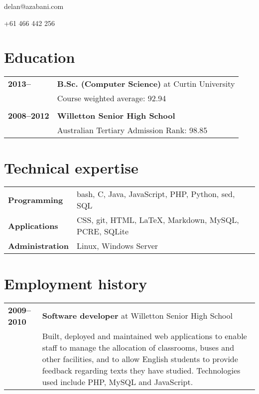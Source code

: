 \documentclass[a4paper,12pt]{article}
\begin{document}
\hrulefill

\hspace{1cm}\begin{minipage}{7cm}
	{\Huge delan\textcolor{lg}@azabani\textcolor{lg}{.com}}
\end{minipage}\hfill\begin{minipage}{4cm}
	\hfill	+61 466 442 256	\par
\end{minipage}\hspace{1cm}

\hrulefill

\section*{Education}

\begin{tabular}{p{4cm}p{14cm}}
	\textbf{2013--} &
		\textbf{B.Sc. (Computer Science)} at Curtin University\\
		& Course weighted average: 92.94\\\\
	\textbf{2008--2012} &
		\textbf{Willetton Senior High School}\\
		& Australian Tertiary Admission Rank: 98.85\\
\end{tabular}

\section*{Technical expertise}

\begin{tabular}{p{4cm}p{14cm}}
	\textbf{Programming} &
		bash, C, Java, JavaScript, PHP, Python, sed, SQL \\
	\textbf{Applications} &
		CSS, git, HTML, \LaTeX, Markdown, MySQL, PCRE, SQLite \\
	\textbf{Administration} &
		Linux, Windows Server \\
\end{tabular}

\section*{Employment history}

\begin{tabular}{p{4cm}p{14cm}}
	\textbf{2009--2010} &
		\textbf{Software developer} at Willetton Senior High School\\ &
		Built, deployed and maintained web applications to enable staff
		to manage the allocation of classrooms, buses and other
		facilities, and to allow English students to provide feedback
		regarding texts they have studied. Technologies used include
		PHP, MySQL and JavaScript.\\
\end{tabular}
\end{document}

